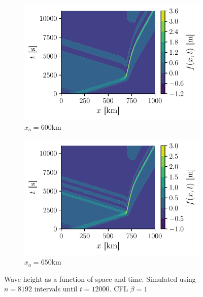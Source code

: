\begin{figure}[h]
    \centering
    \begin{subfigure}{0.48\linewidth}
        \centering
        \includegraphics[width=\linewidth]{figures/corail_eq1_movement_xa=600000.pdf}
        \caption{\(x_a = 600\)km}
        \label{fig:corail_eq1_mouv_xa=60km}
    \end{subfigure}
    \begin{subfigure}{0.48\linewidth}
        \centering
        \includegraphics[width=\linewidth]{figures/corail_eq1_movement_xa=650000.pdf}
        \caption{\(x_a = 650\)km}
        \label{fig:corail_eq1_mouv_xa=65km}
    \end{subfigure}
    \caption{Wave height as a function of space and time. Simulated using \(n=8192\) intervals until \(t=12000\). CFL \(\beta=1\)}
    \label{fig:corail_eq1_mouv_xa}
\end{figure}


